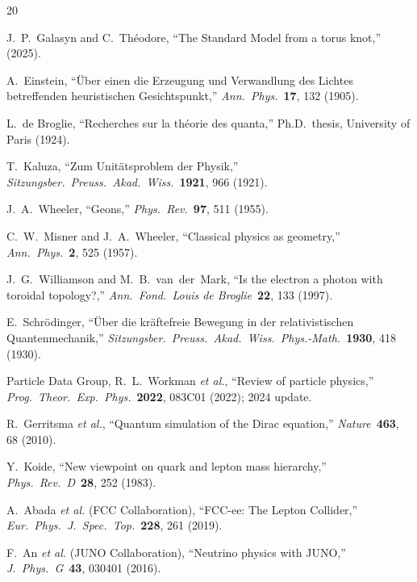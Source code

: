 \documentclass[11pt,a4paper]{article}
\begin{document}
\begin{thebibliography}{20}

J.~P.~Galasyn and C.~Th\'eodore,
``The Standard Model from a torus knot,'' (2025).

A.~Einstein,
``\"Uber einen die Erzeugung und Verwandlung des Lichtes betreffenden heuristischen Gesichtspunkt,''
\emph{Ann.\ Phys.}\ \textbf{17}, 132 (1905).

L.~de Broglie,
``Recherches sur la th\'eorie des quanta,''
Ph.D.\ thesis, University of Paris (1924).

T.~Kaluza,
``Zum Unit\"atsproblem der Physik,''
\emph{Sitzungsber.\ Preuss.\ Akad.\ Wiss.}\ \textbf{1921}, 966 (1921).

J.~A.~Wheeler,
``Geons,''
\emph{Phys.\ Rev.}\ \textbf{97}, 511 (1955).

C.~W.~Misner and J.~A.~Wheeler,
``Classical physics as geometry,''
\emph{Ann.\ Phys.}\ \textbf{2}, 525 (1957).

J.~G.~Williamson and M.~B.~van~der~Mark,
``Is the electron a photon with toroidal topology?,''
\emph{Ann.\ Fond.\ Louis de Broglie}\ \textbf{22}, 133 (1997).

E.~Schr\"odinger,
``\"Uber die kr\"aftefreie Bewegung in der relativistischen Quantenmechanik,''
\emph{Sitzungsber.\ Preuss.\ Akad.\ Wiss.\ Phys.-Math.}\ \textbf{1930}, 418 (1930).

Particle Data Group, R.~L.~Workman \emph{et al.},
``Review of particle physics,''
\emph{Prog.\ Theor.\ Exp.\ Phys.}\ \textbf{2022}, 083C01 (2022); 2024 update.

R.~Gerritsma \emph{et al.},
``Quantum simulation of the Dirac equation,''
\emph{Nature}\ \textbf{463}, 68 (2010).

Y.~Koide,
``New viewpoint on quark and lepton mass hierarchy,''
\emph{Phys.\ Rev.\ D}\ \textbf{28}, 252 (1983).

A.~Abada \emph{et al.} (FCC Collaboration),
``FCC-ee: The Lepton Collider,''
\emph{Eur.\ Phys.\ J.\ Spec.\ Top.}\ \textbf{228}, 261 (2019).

F.~An \emph{et al.} (JUNO Collaboration),
``Neutrino physics with JUNO,''
\emph{J.\ Phys.\ G}\ \textbf{43}, 030401 (2016).


\end{thebibliography}
\end{document}
